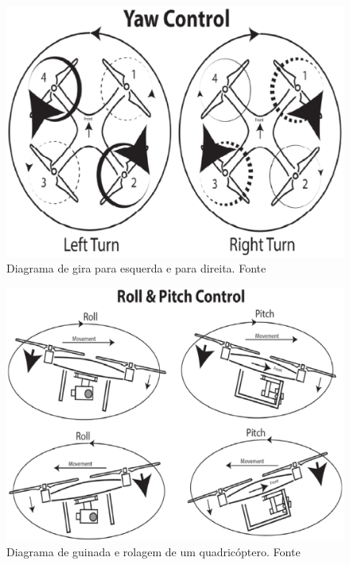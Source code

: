 \begin{figure}[H]
    \centering
      \includegraphics[keepaspectratio=true,scale=0.5]{figuras/gira.eps}
    \caption{Diagrama de gira para esquerda e para direita. Fonte \cite{audronis}}
    \label{fig:gira}
\end{figure}

\begin{figure}[H]
    \centering
      \includegraphics[keepaspectratio=true,scale=0.5]{figuras/guinada.eps}
    \caption[Diagrama de guinada e rolagem de um quadricóptero.]{Diagrama de guinada e rolagem de um quadricóptero. Fonte \cite{audronis}}
    \label{fig:guinada}
\end{figure}

